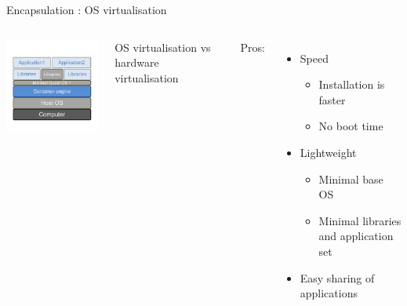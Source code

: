 \begin{frame}{Encapsulation : OS virtualisation}
\begin{columns}

\includegraphics[width=6cm]{02_encapsulation/figures/intro_encapsulation_v2-10.pdf}

OS virtualisation vs hardware virtualisation

Pros:
\begin{itemize}
  \item Speed 
  \begin{itemize}
    \item Installation is faster
    \item No boot time
  \end{itemize}
  \item Lightweight
  \begin{itemize}
    \item Minimal base OS
    \item Minimal libraries and application set
  \end{itemize}
  \item Easy sharing of applications
\end{itemize}

\end{columns}
\end{frame}

